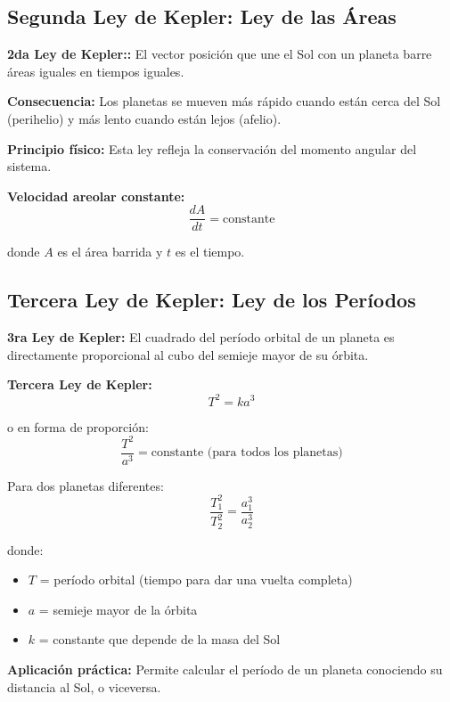 \subsection{Segunda Ley de Kepler: Ley de las Áreas}

\begin{seccion}
\begin{defincion}
    \textbf{2da Ley de Kepler::} El vector posición que une el Sol con un planeta barre áreas iguales en tiempos iguales.
\end{defincion}

\textbf{Consecuencia:} Los planetas se mueven más rápido cuando están cerca del Sol (perihelio) y más lento cuando están lejos (afelio).

\textbf{Principio físico:} Esta ley refleja la conservación del momento angular del sistema.

\begin{ecuacion}
\textbf{Velocidad areolar constante:}
$$\frac{dA}{dt} = \text{constante}$$

donde $A$ es el área barrida y $t$ es el tiempo.
\end{ecuacion}
\end{seccion}
\newpage
\subsection{Tercera Ley de Kepler: Ley de los Períodos}

\begin{seccion}

\textbf{3ra Ley de Kepler:} El cuadrado del período orbital de un planeta es directamente proporcional al cubo del semieje mayor de su órbita.

\begin{ecuacion}
\textbf{Tercera Ley de Kepler:}
$$T^2 = k a^3$$

o en forma de proporción:
$$\frac{T^2}{a^3} = \text{constante (para todos los planetas)}$$

Para dos planetas diferentes:
$$\frac{T_1^2}{T_2^2} = \frac{a_1^3}{a_2^3}$$

donde:
\begin{itemize}
    \item $T$ = período orbital (tiempo para dar una vuelta completa)
    \item $a$ = semieje mayor de la órbita
    \item $k$ = constante que depende de la masa del Sol
\end{itemize}
\end{ecuacion}

\textbf{Aplicación práctica:} Permite calcular el período de un planeta conociendo su distancia al Sol, o viceversa.
\end{seccion}


